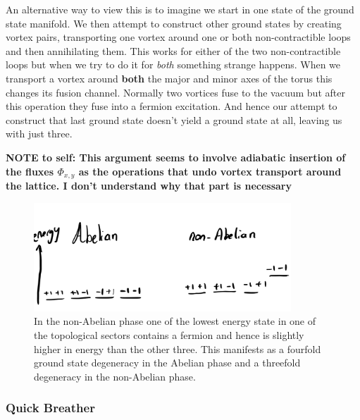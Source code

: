 An alternative way to view this is to imagine we start in one state of the ground state manifold. We then attempt to construct other ground states by creating vortex pairs, transporting one vortex around one or both non-contractible loops and then annihilating them. This works for either of the two non-contractible loops but when we try to do it for \emph{both} something strange happens. When we transport a vortex around \textbf{both} the major and minor axes of the torus this changes its fusion channel. Normally two vortices fuse to the vacuum but after this operation they fuse into a fermion excitation. And hence our attempt to construct that last ground state doesn't yield a ground state at all, leaving us with just three.

\textbf{NOTE to self: This argument seems to involve adiabatic insertion of the fluxes \(\Phi_{x,y}\) as the operations that undo vortex transport around the lattice. I don't understand why that part is necessary}

\hypertarget{fig:threefold_degeneracy}{%
\begin{figure}
\centering
\includegraphics[width=0.86\textwidth,height=\textheight]{figure_code/amk_chapter/threefold_degeneracy.png}
\caption[{Ground State Degeneracy in the Abelian and Non-Abelian Phases}]{In the non-Abelian phase one of the lowest energy state in one of the topological sectors contains a fermion and hence is slightly higher in energy than the other three. This manifests as a fourfold ground state degeneracy in the Abelian phase and a threefold degeneracy in the non-Abelian phase.}
\label{fig:threefold_degeneracy}
\end{figure}
}

\hypertarget{quick-breather}{%
\subsubsection{Quick Breather}\label{quick-breather}}

